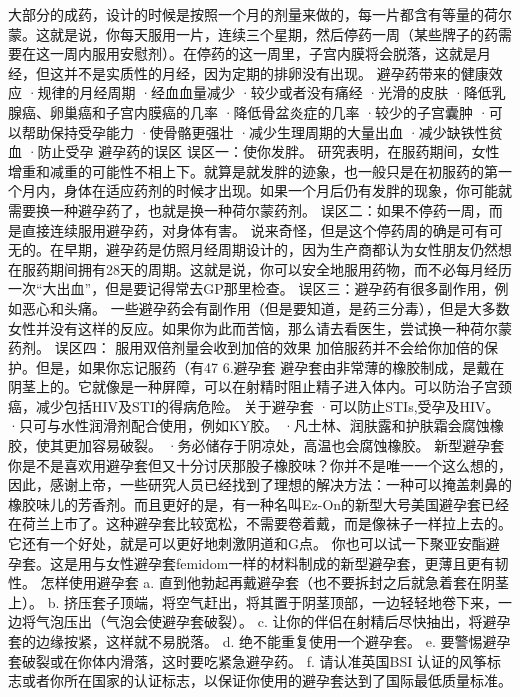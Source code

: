 \documentclass[12pt,UTF8]{ctexbook}
\begin{document}
大部分的成药，设计的时候是按照一个月的剂量来做的，每一片都含有等量的荷尔蒙。这就是说，你每天服用一片，连续三个星期，然后停药一周（某些牌子的药需要在这一周内服用安慰剂）。在停药的这一周里，子宫内膜将会脱落，这就是月经，但这并不是实质性的月经，因为定期的排卵没有出现。
避孕药带来的健康效应
·规律的月经周期
·经血血量减少
·较少或者没有痛经
·光滑的皮肤
·降低乳腺癌、卵巢癌和子宫内膜癌的几率
·降低骨盆炎症的几率
·较少的子宫囊肿
·可以帮助保持受孕能力
·使骨骼更强壮
·减少生理周期的大量出血
·减少缺铁性贫血
·防止受孕
避孕药的误区
误区一：使你发胖。
研究表明，在服药期间，女性增重和减重的可能性不相上下。就算是就发胖的迹象，也一般只是在初服药的第一个月内，身体在适应药剂的时候才出现。如果一个月后仍有发胖的现象，你可能就需要换一种避孕药了，也就是换一种荷尔蒙药剂。
误区二：如果不停药一周，而是直接连续服用避孕药，对身体有害。
说来奇怪，但是这个停药周的确是可有可无的。在早期，避孕药是仿照月经周期设计的，因为生产商都认为女性朋友仍然想在服药期间拥有28天的周期。这就是说，你可以安全地服用药物，而不必每月经历一次“大出血”，但是要记得常去GP那里检查。
误区三：避孕药有很多副作用，例如恶心和头痛。
一些避孕药会有副作用（但是要知道，是药三分毒），但是大多数女性并没有这样的反应。如果你为此而苦恼，那么请去看医生，尝试换一种荷尔蒙药剂。
误区四： 服用双倍剂量会收到加倍的效果
加倍服药并不会给你加倍的保护。但是，如果你忘记服药（有47%
6.避孕套
避孕套由非常薄的橡胶制成，是戴在阴茎上的。它就像是一种屏障，可以在射精时阻止精子进入体内。可以防治子宫颈癌，减少包括HIV及STI的得病危险。
关于避孕套
·可以防止STIs,受孕及HIV。
·只可与水性润滑剂配合使用，例如KY胶。
·凡士林、润肤露和护肤霜会腐蚀橡胶，使其更加容易破裂。
·务必储存于阴凉处，高温也会腐蚀橡胶。
新型避孕套
你是不是喜欢用避孕套但又十分讨厌那股子橡胶味？你并不是唯一一个这么想的，因此，感谢上帝，一些研究人员已经找到了理想的解决方法：一种可以掩盖刺鼻的橡胶味儿的芳香剂。而且更好的是，有一种名叫Ez-On的新型大号美国避孕套已经在荷兰上市了。这种避孕套比较宽松，不需要卷着戴，而是像袜子一样拉上去的。它还有一个好处，就是可以更好地刺激阴道和G点。
你也可以试一下聚亚安酯避孕套。这是用与女性避孕套femidom一样的材料制成的新型避孕套，更薄且更有韧性。
怎样使用避孕套
a. 直到他勃起再戴避孕套（也不要拆封之后就急着套在阴茎上）。
b. 挤压套子顶端，将空气赶出，将其置于阴茎顶部，一边轻轻地卷下来，一边将气泡压出（气泡会使避孕套破裂）。
c. 让你的伴侣在射精后尽快抽出，将避孕套的边缘按紧，这样就不易脱落。
d. 绝不能重复使用一个避孕套。
e. 要警惕避孕套破裂或在你体内滑落，这时要吃紧急避孕药。
f. 请认准英国BSI 认证的风筝标志或者你所在国家的认证标志，以保证你使用的避孕套达到了国际最低质量标准。
\end{document}
